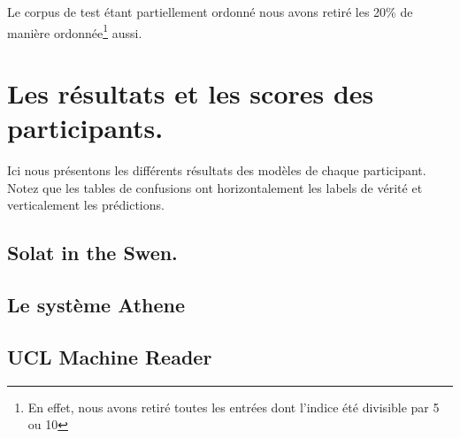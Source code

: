 \documentclass[onecolumn, 12pt]{article}
\begin{document}
Le corpus de test étant partiellement ordonné nous avons retiré les 20\% de manière ordonnée\footnote{En effet, nous avons retiré toutes les entrées dont l'indice été divisible par 5 ou 10} aussi.

\section{Les résultats et les scores des participants.}
Ici nous présentons les différents résultats des modèles de chaque participant. Notez que les tables de confusions ont horizontalement les labels de vérité et verticalement les prédictions.
\subsection{Solat in the Swen.}


\subsection{Le système Athene}


\subsection{UCL Machine Reader}

\end{document}
